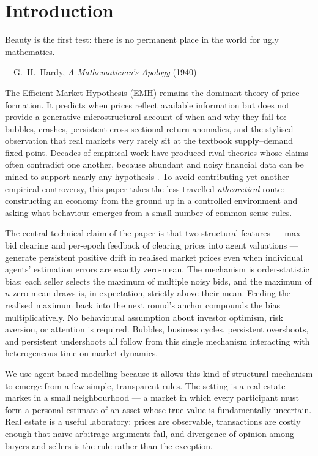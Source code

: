 \section{Introduction}
\label{sec:intro}

\epigraph{Beauty is the first test: there is no permanent place in the world
for ugly mathematics.}{---G.~H.~Hardy, \emph{A Mathematician's Apology} (1940)}

The Efficient Market Hypothesis (EMH) remains the dominant theory of
price formation. It predicts when prices reflect available information
but does not provide a generative microstructural account of when and
why they fail to: bubbles, crashes, persistent cross-sectional return
anomalies, and the stylised observation that real markets very rarely
sit at the textbook supply--demand fixed point. Decades of empirical
work have produced rival theories whose claims often contradict one
another, because abundant and noisy financial data can be mined to
support nearly any hypothesis \citep{moffitt2017}. To avoid
contributing yet another empirical controversy, this paper takes the
less travelled \emph{atheoretical} route: constructing an economy from
the ground up in a controlled environment and asking what behaviour
emerges from a small number of common-sense rules.

The central technical claim of the paper is that two structural
features --- max-bid clearing and per-epoch feedback of clearing
prices into agent valuations --- generate persistent positive drift
in realised market prices even when individual agents' estimation
errors are exactly zero-mean. The mechanism is order-statistic bias:
each seller selects the maximum of multiple noisy bids, and the
maximum of $n$ zero-mean draws is, in expectation, strictly above
their mean. Feeding the realised maximum back into the next round's
anchor compounds the bias multiplicatively. No behavioural assumption
about investor optimism, risk aversion, or attention is required.
Bubbles, business cycles, persistent overshoots, and persistent
undershoots all follow from this single mechanism interacting with
heterogeneous time-on-market dynamics.

We use agent-based modelling \citep{wilensky1999} because it allows
this kind of structural mechanism to emerge from a few simple,
transparent rules. The setting is a real-estate market in a small
neighbourhood --- a market in which every participant must form a
personal estimate of an asset whose true value is fundamentally
uncertain. Real estate is a useful laboratory: prices are observable,
transactions are costly enough that na\"ive arbitrage arguments fail,
and divergence of opinion among buyers and sellers is the rule
rather than the exception.

